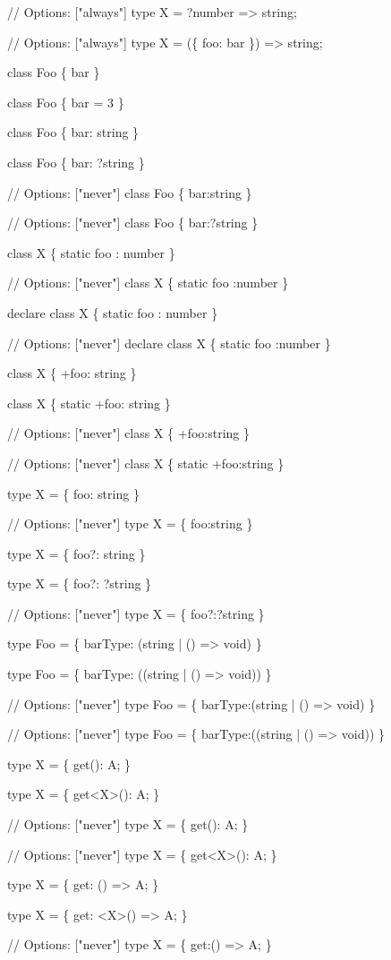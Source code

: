 \begin{DoxyCode}
// Options: ["always"]
type X = ?number => string;

// Options: ["always"]
type X = (\{ foo: bar \}) => string;

class Foo \{ bar \}

class Foo \{ bar = 3 \}

class Foo \{ bar: string \}

class Foo \{ bar: ?string \}

// Options: ["never"]
class Foo \{ bar:string \}

// Options: ["never"]
class Foo \{ bar:?string \}

class X \{ static foo : number \}

// Options: ["never"]
class X \{ static foo :number \}

declare class X \{ static foo : number \}

// Options: ["never"]
declare class X \{ static foo :number \}

class X \{ +foo: string \}

class X \{ static +foo: string \}

// Options: ["never"]
class X \{ +foo:string \}

// Options: ["never"]
class X \{ static +foo:string \}

type X = \{ foo: string \}

// Options: ["never"]
type X = \{ foo:string \}

type X = \{ foo?: string \}

type X = \{ foo?: ?string \}

// Options: ["never"]
type X = \{ foo?:?string \}

type Foo = \{ barType: (string | () => void) \}

type Foo = \{ barType: ((string | () => void)) \}

// Options: ["never"]
type Foo = \{ barType:(string | () => void) \}

// Options: ["never"]
type Foo = \{ barType:((string | () => void)) \}

type X = \{ get(): A; \}

type X = \{ get<X>(): A; \}

// Options: ["never"]
type X = \{ get(): A; \}

// Options: ["never"]
type X = \{ get<X>(): A; \}

type X = \{ get: () => A; \}

type X = \{ get: <X>() => A; \}

// Options: ["never"]
type X = \{ get:() => A; \}


\end{DoxyCode}
